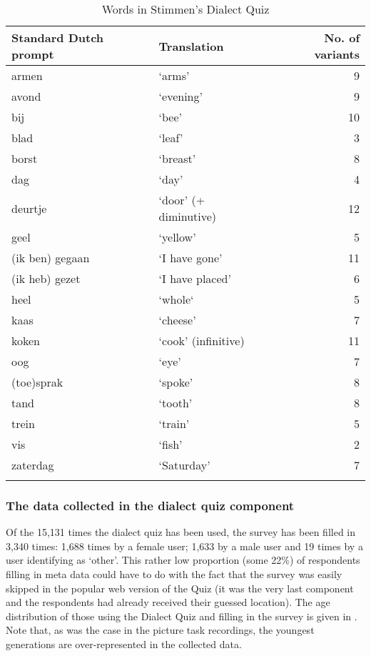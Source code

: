 \documentclass[output=paper,hidelinks]{langscibook}
\begin{document}
\begin{table}
\begin{tabularx}{\textwidth}{XXr}

\lsptoprule

{\bfseries Standard Dutch prompt} & {\bfseries Translation} & {\bfseries No. of variants}\\
\midrule
armen & ‘arms’ & 9\\
avond & ‘evening’ & 9\\
bij & ‘bee’ & 10\\
blad & ‘leaf’ & 3\\
borst & ‘breast’ & 8\\
dag & ‘day’ & 4\\
deurtje & ‘door’ (+ diminutive) & 12\\
geel & ‘yellow’ & 5\\
(ik ben) gegaan & ‘I have gone’ & 11\\
(ik heb) gezet & ‘I have placed’ & 6\\
heel & ‘whole‘ & 5\\
kaas & ‘cheese’ & 7\\
koken & ‘cook’ (infinitive) & 11\\
oog & ‘eye’ & 7\\
(toe)sprak & ‘spoke’ & 8\\
tand & ‘tooth’ & 8\\
trein & ‘train’ & 5\\
vis & ‘fish’ & 2\\
zaterdag & ‘Saturday’ & 7\\
\lspbottomrule
\end{tabularx}
\caption{Words in Stimmen's Dialect Quiz}
\end{table}

\subsubsection{The data collected in the dialect quiz component}


Of the 15,131 times the dialect quiz has been used, the survey has been filled in 3,340 times: 1,688 times by a female user; 1,633 by a male user and 19 times by a user identifying as ‘other’. This rather low proportion (some 22\%) of respondents filling in meta data could have to do with the fact that the survey was easily skipped in the popular web version of the Quiz (it was the very last component and the respondents had already received their guessed location). The age distribution of those using the Dialect Quiz and filling in the survey is given in . Note that, as was the case in the picture task recordings, the youngest generations are over-represented in the collected data.
\end{document}
